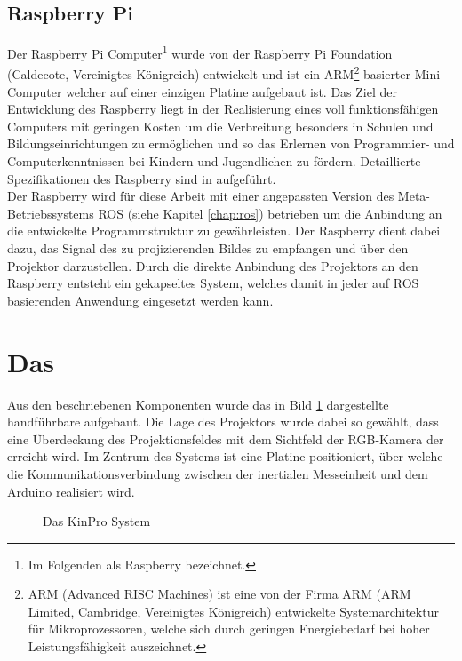 \subsection{Raspberry Pi\textsuperscript{\texttrademark}}
Der Raspberry Pi\textsuperscript{\texttrademark} Computer\footnote{Im Folgenden als Raspberry bezeichnet.} wurde von der Raspberry Pi Foundation (Caldecote, Vereinigtes Königreich) entwickelt und ist ein ARM\footnote{ARM (Advanced RISC Machines) ist eine von der Firma ARM (ARM Limited, Cambridge, Vereinigtes Königreich) entwickelte Systemarchitektur für Mikroprozessoren, welche sich durch geringen Energiebedarf bei hoher Leistungsfähigkeit auszeichnet.}-basierter Mini-Computer welcher auf einer einzigen Platine aufgebaut ist. Das Ziel der Entwicklung des Raspberry liegt in der Realisierung eines voll funktionsfähigen Computers mit geringen Kosten um die Verbreitung besonders in Schulen und Bildungseinrichtungen zu ermöglichen und so das Erlernen von Programmier- und Computerkenntnissen bei Kindern und Jugendlichen zu fördern. Detaillierte Spezifikationen des Raspberry sind in  aufgeführt.\\

Der Raspberry wird für diese Arbeit mit einer angepassten Version des Meta-Betriebssystems ROS (siehe Kapitel \ref{chap:ros}) betrieben um die Anbindung an die entwickelte Programmstruktur zu gewährleisten. Der Raspberry dient dabei dazu, das Signal des zu projizierenden Bildes zu empfangen und über den Projektor darzustellen. Durch die direkte Anbindung des Projektors an den Raspberry entsteht ein gekapseltes System, welches damit in jeder auf ROS basierenden Anwendung eingesetzt werden kann.

\section{Das \kps{}}
Aus den beschriebenen Komponenten wurde das in Bild \ref{fig.kinpro} dargestellte handführbare \kps{} aufgebaut. Die Lage des Projektors wurde dabei so gewählt, dass eine Überdeckung des Projektionsfeldes mit dem Sichtfeld der RGB-Kamera der \kin erreicht wird. Im Zentrum des Systems ist eine Platine positioniert, über welche die Kommunikationsverbindung zwischen der inertialen Messeinheit und dem Arduino realisiert wird.\\

\begin{figure}[ht]
	\begin{center}%
		\caption{Das KinPro System}
		\label{fig.kinpro}
	\end{center}
\end{figure}

